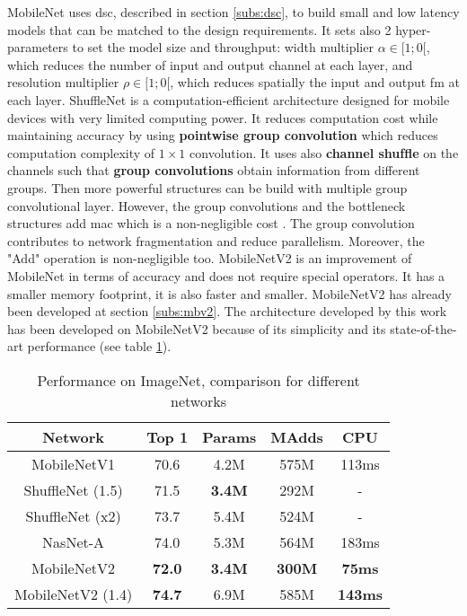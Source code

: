 %
MobileNet \cite{howard_mobilenets_2017} uses \acrshort{dsc}, described in section \ref{subs:dsc}, to build small and low latency models that can be matched to the design requirements. It sets also 2 hyper-parameters to set the model size and throughput: width multiplier $\alpha \in [1; 0[$, which reduces the number of input and output channel at each layer, and resolution multiplier $\rho \in [1; 0[$,  which reduces spatially the input and output \acrshort{fm} at each layer.\newline \newline
%
ShuffleNet \cite{zhang_shufflenet_2018} is a computation-efficient architecture designed for mobile devices with very limited computing power. It reduces computation cost while maintaining accuracy by using \textbf{pointwise group convolution} which reduces computation complexity of $1 \times 1$ convolution. It uses also \textbf{channel shufﬂe} on the channels such that \textbf{group convolutions} obtain information from different groups. Then more powerful structures can be build with multiple group convolutional layer. However, the group convolutions and the bottleneck structures add \acrshort{mac} which is a non-negligible cost \cite{ma_shufflenet_2018}. The group convolution contributes to network fragmentation and reduce parallelism. Moreover, the "Add" operation is non-negligible too. \newline \newline
%
MobileNetV2 \cite{sandler_mobilenetv2_2019} is an improvement of MobileNet in terms of accuracy and does not require special operators. It has a smaller memory footprint, it is also faster and smaller. MobileNetV2 has already been developed at section \ref{subs:mbv2}. The architecture developed by this work has been developed on MobileNetV2 because of its simplicity and its state-of-the-art performance (see table \ref{tab:mbv2}).
%
\begin{table}
    \center
    \begin{tabular}{ | c | c | c c | c| }
        \hline \hline
        Network & Top 1 & Params & MAdds & CPU \\
        \hline \hline
        MobileNetV1 & 70.6 & 4.2M & 575M & 113ms \\
        ShuffleNet (1.5) & 71.5 & \textbf{3.4M} & 292M & - \\
        ShuffleNet (x2)  & 73.7 & 5.4M & 524M & - \\
        NasNet-A & 74.0 & 5.3M & 564M & 183ms \\
        \hline
        MobileNetV2 & \textbf{72.0} & \textbf{3.4M} & \textbf{300M} & \textbf{75ms} \\
        MobileNetV2 (1.4) & \textbf{74.7} & 6.9M & 585M & \textbf{143ms} \\
        \hline \hline
    \end{tabular}
    \caption{Performance on ImageNet, comparison for different networks \cite{sandler_mobilenetv2_2019}}
    \label{tab:mbv2}
\end{table}
%
%
